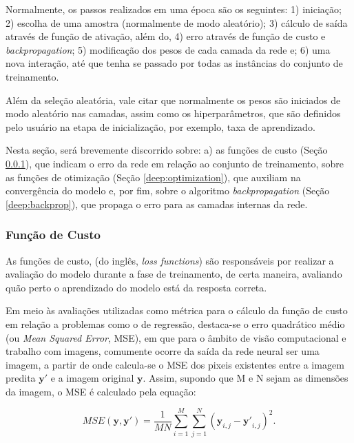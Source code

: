 Normalmente, os passos realizados em uma época são os seguintes: 1) iniciação; 2) escolha de uma amostra (normalmente de modo aleatório); 3) cálculo de saída através de função de ativação, além do, 4) erro através de função de custo e \textit{backpropagation}; 5) modificação dos pesos de cada camada da rede e; 6) uma nova interação, até que tenha se passado por todas as instâncias do conjunto de treinamento.

Além da seleção aleatória, vale citar que normalmente os pesos são iniciados de modo aleatório nas camadas, assim como os hiperparâmetros, que são definidos pelo usuário na etapa de inicialização, por exemplo, taxa de aprendizado.

Nesta seção, será brevemente discorrido sobre: a) as funções de custo (Seção \ref{deep:cust}), que indicam o erro da rede em relação ao conjunto de treinamento, sobre as funções de otimização (Seção \ref{deep:optimization}), que auxiliam na convergência do modelo e, por fim, sobre o algoritmo \textit{backpropagation} (Seção \ref{deep:backprop}), que propaga o erro para as camadas internas da rede.


\subsubsection{Função de Custo}
\label{deep:cust}

As funções de custo, (do inglês, \textit{loss functions}) são responsáveis por realizar a avaliação do modelo durante a fase de treinamento, de certa maneira, avaliando quão perto o aprendizado do modelo está da resposta correta.

Em meio às avaliações utilizadas como métrica para o cálculo da função de custo em relação a problemas como o de regressão, destaca-se o erro quadrático médio (ou \textit{Mean Squared Error}, MSE)\cite{Wang2004}, em que para o âmbito de visão computacional e trabalho com imagens, comumente ocorre da saída da rede neural ser uma imagem, a partir de onde calcula-se o MSE dos pixeis existentes entre a imagem predita $\boldsymbol{y'}$ e a imagem original $\boldsymbol{y}$. Assim, supondo que M e N sejam as dimensões da imagem, o MSE é calculado pela equação:

\begin{equation}
    \label{deep:eq:9}
    MSE(\boldsymbol{y}, \boldsymbol{y'}) = \frac{1}{MN} \sum_{i=1}^{M} \sum_{j=1}^{N} (\boldsymbol{y}_{i,j} - \boldsymbol{y'}_{i,j})^2.
\end{equation}


